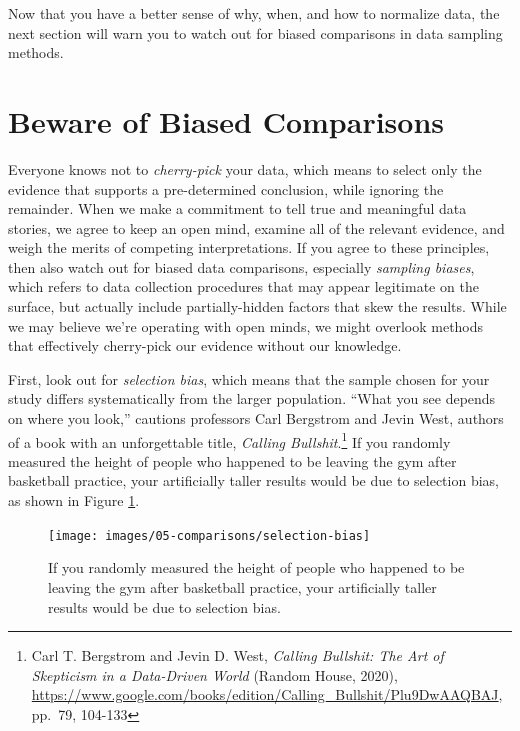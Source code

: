 \documentclass[
  english,
]{book}
\begin{document}
Now that you have a better sense of why, when, and how to normalize data, the next section will warn you to watch out for biased comparisons in data sampling methods.

\hypertarget{biased-comparisons}{%
\section*{Beware of Biased Comparisons}\label{biased-comparisons}}

Everyone knows not to \emph{cherry-pick} your data, which means to select only the evidence that supports a pre-determined conclusion, while ignoring the remainder. When we make a commitment to tell true and meaningful data stories, we agree to keep an open mind, examine all of the relevant evidence, and weigh the merits of competing interpretations. If you agree to these principles, then also watch out for biased data comparisons, especially \emph{sampling biases}, which refers to data collection procedures that may appear legitimate on the surface, but actually include partially-hidden factors that skew the results. While we may believe we're operating with open minds, we might overlook methods that effectively cherry-pick our evidence without our knowledge.

First, look out for \emph{selection bias}, which means that the sample chosen for your study differs systematically from the larger population. ``What you see depends on where you look,'' cautions professors Carl Bergstrom and Jevin West, authors of a book with an unforgettable title, \emph{Calling Bullshit}.\footnote{Carl T. Bergstrom and Jevin D. West, \emph{Calling {Bullshit}: {The Art} of {Skepticism} in a {Data}-{Driven World}} ({Random House}, 2020), \url{https://www.google.com/books/edition/Calling_Bullshit/Plu9DwAAQBAJ}, pp.~79, 104-133} If you randomly measured the height of people who happened to be leaving the gym after basketball practice, your artificially taller results would be due to selection bias, as shown in Figure \ref{fig:selection-bias}.



\begin{figure}
\texttt{[image: images/05-comparisons/selection-bias]} \caption{If you randomly measured the height of people who happened to be leaving the gym after basketball practice, your artificially taller results would be due to selection bias.}\label{fig:selection-bias}
\end{figure}
\end{document}
